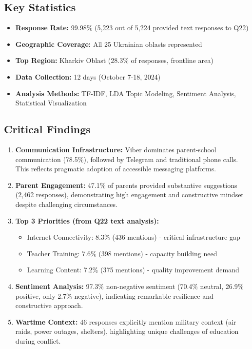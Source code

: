 \documentclass[11pt,a4paper]{article}
\begin{document}
\subsection{Key Statistics}

\begin{itemize}
    \item \textbf{Response Rate:} 99.98\% (5,223 out of 5,224 provided text responses to Q22)
    \item \textbf{Geographic Coverage:} All 25 Ukrainian oblasts represented
    \item \textbf{Top Region:} Kharkiv Oblast (28.3\% of responses, frontline area)
    \item \textbf{Data Collection:} 12 days (October 7-18, 2024)
    \item \textbf{Analysis Methods:} TF-IDF, LDA Topic Modeling, Sentiment Analysis, Statistical Visualization
\end{itemize}

\subsection{Critical Findings}

\begin{enumerate}
    \item \textbf{Communication Infrastructure:} Viber dominates parent-school communication (78.5\%), followed by Telegram and traditional phone calls. This reflects pragmatic adoption of accessible messaging platforms.

    \item \textbf{Parent Engagement:} 47.1\% of parents provided substantive suggestions (2,462 responses), demonstrating high engagement and constructive mindset despite challenging circumstances.

    \item \textbf{Top 3 Priorities (from Q22 text analysis):}
    \begin{itemize}
        \item Internet Connectivity: 8.3\% (436 mentions) - critical infrastructure gap
        \item Teacher Training: 7.6\% (398 mentions) - capacity building need
        \item Learning Content: 7.2\% (375 mentions) - quality improvement demand
    \end{itemize}

    \item \textbf{Sentiment Analysis:} 97.3\% non-negative sentiment (70.4\% neutral, 26.9\% positive, only 2.7\% negative), indicating remarkable resilience and constructive approach.

    \item \textbf{Wartime Context:} 46 responses explicitly mention military context (air raids, power outages, shelters), highlighting unique challenges of education during conflict.
\end{enumerate}
\end{document}
